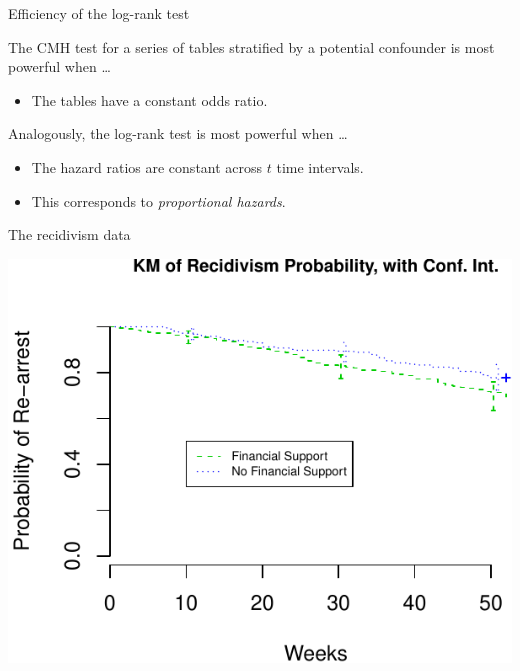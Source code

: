 \documentclass[ignorenonframetext,]{beamer}
\providecommand{\tightlist}{%
  \setlength{\itemsep}{0pt}\setlength{\parskip}{0pt}}
\begin{document}
\begin{frame}{%
\protect\hypertarget{efficiency-of-the-log-rank-test}{%
Efficiency of the log-rank test}}

The CMH test for a series of tables stratified by a potential confounder
is most powerful when \ldots  

\begin{itemize}
\tightlist
\item
  The tables have a constant odds ratio.
\end{itemize}

Analogously, the log-rank test is most powerful when \ldots

\begin{itemize}
\item
  The hazard ratios are constant across \(t\) time intervals.
\item
  This corresponds to \emph{proportional hazards}.
\end{itemize}

\end{frame}

\begin{frame}{%
\protect\hypertarget{the-recidivism-data}{%
The recidivism data}}

\includegraphics{unit_03_significance_testing_files/figure-beamer/unnamed-chunk-7-1.pdf}

\end{frame}
\end{document}

